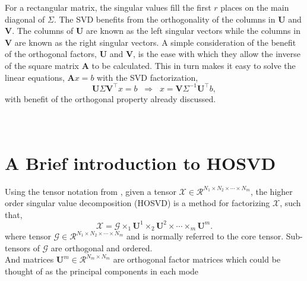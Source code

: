 \documentclass[preprint,12pt]{elsarticle}
\begin{document}
\medskip
For a rectangular matrix, the singular values fill the first $r$ places on the main diagonal of $\Sigma$. The SVD benefits from the orthogonality of the columns in $\mathbf{U}$ and $\mathbf{V}$. The columns of $\mathbf{U}$ are known as the left singular vectors while the columns in $\mathbf{V}$ are known as the right singular vectors. A simple consideration of the benefit of the orthogonal factors, $\mathbf{U}$ and $\mathbf{V}$, is the ease with which they allow the inverse of the square matrix $\mathbf{A}$ to be calculated. This in turn makes it easy to solve the linear equations, $\mathbf{A}x = b$ with the SVD factorization,
\begin{equation}\label{e:SVD_factorization}
 \mathbf{U} \Sigma \mathbf{V}^{\intercal} x = b \;\;\Longrightarrow\;\; x = \mathbf{V} \Sigma^{-1} \mathbf{U}^{\intercal} b,
\end{equation} 
with benefit of the orthogonal property already discussed.


\section{\\A Brief introduction to HOSVD}\label{subsection:hosvd_brief}
Using the tensor notation from \citet{Kolda_2009}, given a tensor $\mathscr{X}\in\mathcal{R}^{N_{1}\times N_{2}\times \cdots \times N_{m}}$, the higher order singular value decomposition (HOSVD) is a method for factorizing $\mathscr{X}$, such that,
\begin{equation}
  \mathscr{X} = \mathscr{G} \times_{1} \mathbf{U}^{1}\times_{2} \mathbf{U}^{2}\times \cdots \times_{m} \mathbf{U}^{m}.
\end{equation}
where tensor $\mathscr{G}\in\mathcal{R}^{N_{1}\times N_{2}\times \cdots \times N_{m}}$ and is normally referred to the core tensor. Sub-tensors of $\mathscr{G}$ are orthogonal and ordered.\\
And matrices $\mathbf{U}^{m}\in\mathcal{R}^{N_{m}\times N_{m}}$ are orthogonal factor matrices which could be thought of as the principal components in each mode

\clearpage 
 
%
%

  
\clearpage 

%
\clearpage  
\listoffigures
\clearpage
 
\end{document}
